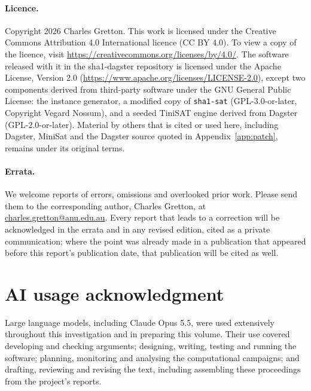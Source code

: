 \documentclass[11pt,a4paper]{article}
\begin{document}
\paragraph{Licence.} Copyright 2026 Charles Gretton. This work is licensed under the Creative Commons
Attribution 4.0 International licence (CC BY 4.0). To view a copy of the licence, visit
\url{https://creativecommons.org/licenses/by/4.0/}. The software released with it in the sha1-dagster
repository is licensed under the Apache License, Version 2.0
(\url{https://www.apache.org/licenses/LICENSE-2.0}), except two components derived from third-party
software under the GNU General Public License: the instance generator, a modified copy of
\texttt{sha1-sat} \cite{nossum} (GPL-3.0-or-later, Copyright Vegard Nossum), and a seeded TiniSAT
engine derived from Dagster (GPL-2.0-or-later). Material by others that is cited or used here,
including Dagster, MiniSat and the Dagster source quoted in Appendix~\ref{app:patch}, remains under
its original terms.

\paragraph{Errata.} We welcome reports of errors, omissions and overlooked prior work. Please send them to the
corresponding author, Charles Gretton, at \href{mailto:charles.gretton@anu.edu.au}{charles.gretton@anu.edu.au}.
Every report that leads to a correction will be acknowledged in the errata and in any revised edition,
cited as a private communication; where the point was already made in a publication that appeared before
this report's publication date, that publication will be cited as well.

\section*{AI usage acknowledgment}

Large language models, including Claude Opus 5.5, were used extensively throughout this investigation
and in preparing this volume. Their use covered developing and checking arguments; designing,
writing, testing and running the software; planning, monitoring and analysing the computational
campaigns; and drafting, reviewing and revising the text, including assembling these proceedings from
the project's reports.
\end{document}
